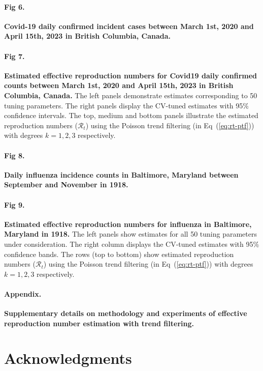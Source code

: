 \documentclass[10pt,letterpaper]{article}
\def\calR{\mathcal{R}}
\renewcommand{\eqref}[1]{Eq~(\ref{#1})}
\begin{document}
\paragraph*{Fig 6.}
\label{fig:covid-data}
{\bf Covid-19 daily confirmed incident cases between March 1st, 
2020 and April 15th, 2023 in British Columbia, Canada.}

\paragraph*{Fig 7.}
\label{fig:covid-rt}
{\bf Estimated effective reproduction numbers for Covid19 daily confirmed 
counts between March 1st, 2020 and April 15th, 2023 in British Columbia, Canada.} 
The left panels demonstrate estimates corresponding to 50 tuning parameters. 
The right panels display the CV-tuned estimates with 95\% confidence intervals. 
The top, medium and bottom panels illustrate the estimated reproduction numbers 
($\calR_t$) using the Poisson trend filtering (in \eqref{eq:rt-ptf}) with 
degrees $k=1,2,3$ respectively.

\paragraph*{Fig 8.}
\label{fig:flu-dat}
{\bf Daily influenza incidence counts in Baltimore, Maryland between September 
and November in 1918.}

\paragraph*{Fig 9.}
\label{fig:flu-res}
{\bf Estimated effective reproduction numbers for influenza in
Baltimore, Maryland in 1918.} The left panels show estimates for all
50 tuning parameters under consideration. The right column displays the 
CV-tuned estimates with 95\% confidence bands. The rows (top to bottom) show
estimated reproduction numbers ($\calR_t$) using the Poisson trend filtering
(in \eqref{eq:rt-ptf}) with degrees $k=1,2,3$ respectively.

\paragraph*{Appendix.}
\label{Appendix}
{\bf Supplementary details on methodology and experiments of effective 
reproduction number estimation with trend filtering.} 


\section*{Acknowledgments}
\end{document}
